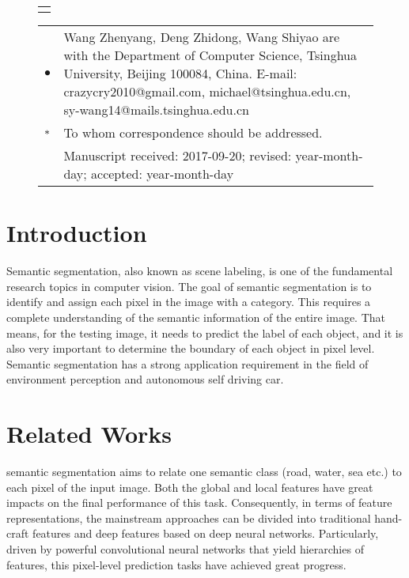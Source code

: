 \documentclass[10.5pt,compsoc]{TsT}
\theoremstyle{mystyle}
\begin{document}
{\begin{strip}
{\begin{tabular}{p{160mm}}
\end{tabular}
}
\vskip 6mm

\vskip -3mm
\end{strip}


\thispagestyle{plain}%
\thispagestyle{empty}%
\makeatother
\pagestyle{tstheadings}

\begin{figure}[b]
\vskip -6mm
\begin{tabular}{p{44mm}}
\toprule\\
\end{tabular}
\vskip -4.5mm
\noindent
\setlength{\tabcolsep}{1pt}
\begin{tabular}{p{1.5mm}p{79.5mm}}
$\bullet$& Wang Zhenyang, Deng Zhidong, Wang Shiyao are with the Department of Computer Science, Tsinghua University, Beijing 100084, China. E-mail: crazycry2010@gmail.com, michael@tsinghua.edu.cn, sy-wang14@mails.tsinghua.edu.cn \\
$\sf{*}$&
To whom correspondence should be addressed. \\
          &          Manuscript received: 2017-09-20; revised: year-month-day; accepted: year-month-day

\end{tabular}
\end{figure}



\section{Introduction}
\label{s:introduction}
\noindent

Semantic segmentation, also known as scene labeling, is one of the fundamental research topics in computer vision. 
The goal of semantic segmentation is to identify and assign each pixel in the image with a category. 
This requires a complete understanding of the semantic information of the entire image. 
That means, for the testing image, it needs to predict the label of each object, and it is also very important to determine the boundary of each object in pixel level. 
Semantic segmentation has a strong application requirement in the field of environment perception and autonomous self driving car.



\section{Related Works}
\label{s:Related}
\noindent
semantic segmentation aims to relate one semantic class (road, water, sea etc.) to each pixel of the input image. Both the global and local features have great impacts on the final performance of this task. Consequently, in terms of feature representations, the mainstream approaches can be divided into traditional hand-craft features and deep features based on deep neural networks. Particularly, driven by powerful convolutional neural networks that yield hierarchies of features, this pixel-level prediction tasks have achieved great progress.

}
\end{document}
